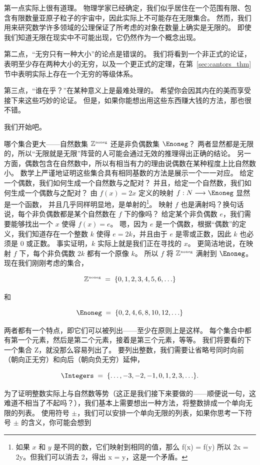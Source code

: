 第一点实际上很有道理。
物理学家已经确定，我们似乎居住在一个范围有限、包含有限数量亚原子粒子的宇宙中，因此实际上不可能存在无限集合。
然而，我们用来研究数学许多领域的公理保证了所考虑的对象在数量上确实是无限的。
即使我们知道无限在现实中不可能出现，它仍然作为一个概念出现。

第二点，“无穷只有一种大小”的论点是错误的。
我们将看到一个非正式的论证，表明至少存在两种大小的无穷，以及一个更正式的定理，在第~\ref{sec:cantors_thm}节中表明实际上存在一个无穷的等级体系。

第三点，“谁在乎？”在某种意义上是最难处理的。
希望你会因其内在的美而享受接下来这些巧妙的论证。
但是，如果你能想出用这些东西赚大钱的方法，那也很不错。

我们开始吧。

哪个集合更大——自然数集 ${\mathbb Z}^{\mbox{\tiny noneg}}$ 还是非负偶数集 $\Enoneg$？
两者显然都是无限的，所以“无限就是无限”阵营的人可能会通过无效的推理得出正确的结论。
另一方面，偶数包含在自然数中，所以有相当有力的理由说偶数在某种程度上比自然数小。
数学上严谨地证明这些集合具有相同基数的方法是展示一个一一对应。
给定一个偶数，我们如何生成一个自然数与之配对？
并且，给定一个自然数，我们如何生成一个偶数与之配对？
由 $f(x) = 2x$ 定义的映射 $f : N \longrightarrow \Enoneg$ 显然是一个函数，
并且几乎同样明显地，是单射的\footnote{如果 $x$ 和 $y$ 是不同的数，它们映射到相同的值，那么 f(x) = f(y) 所以 2x = 2y。但我们可以消去 2，得出 x = y，这是一个矛盾。}。
映射 $f$ 也是满射吗？换句话说，每个非负偶数都是某个自然数在 $f$ 下的像吗？
给定某个非负偶数 $e$，我们需要能够找出一个 $x$ 使得 $f(x) = e$。
嗯，因为 $e$ 是一个偶数，根据“偶数”的定义，我们知道存在一个整数 $k$ 使得 $e = 2k$，并且由于 $e$ 是零或正数，因此 $k$ 也必须是 $0$ 或正数。
事实证明，$k$ 实际上就是我们正在寻找的 $x$。
更简洁地说，在映射 $f$ 下，每个非负偶数 $2k$ 都有一个原像 $k$。
所以 $f$ 将 ${\mathbb Z}^{\mbox{\tiny noneg}}$ 满射到 $\Enoneg$。
现在我们刚刚考虑的集合，

\[ {\mathbb Z}^{\mbox{\tiny noneg}} \; = \;
    \{0, 1, 2, 3, 4, 5, 6, \ldots \} \]

\noindent 和

\[ \Enoneg \; = \;
    \{0, 2, 4, 6, 8, 10, 12, \ldots \} \]

\noindent 两者都有一个特点，即它们可以被列出——至少在原则上是这样。
每个集合中都有第一个元素，然后是第二个元素，接着是第三个元素，等等。
我们将要看的下一个集合 Z，就没那么容易列出了。
要列出整数，我们需要让省略号同时向前（朝向正无穷）和向后（朝向负无穷）延伸，

\[ \Integers \;
    = \; \{ \ldots , -3, -2, -1, 0, 1, 2, 3, \ldots \}.
\]

\noindent 为了证明整数实际上与自然数等势（这正是我们接下来要做的——顺便说一句，这难道不相当了不起吗？），我们基本上需要想出一种方法，将整数排成一个单向无限的列表。
使用符号 $\pm$，我们可以安排一个单向无限的列表，如果你思考一下符号 $\pm$ 的含义，你可能会想到

